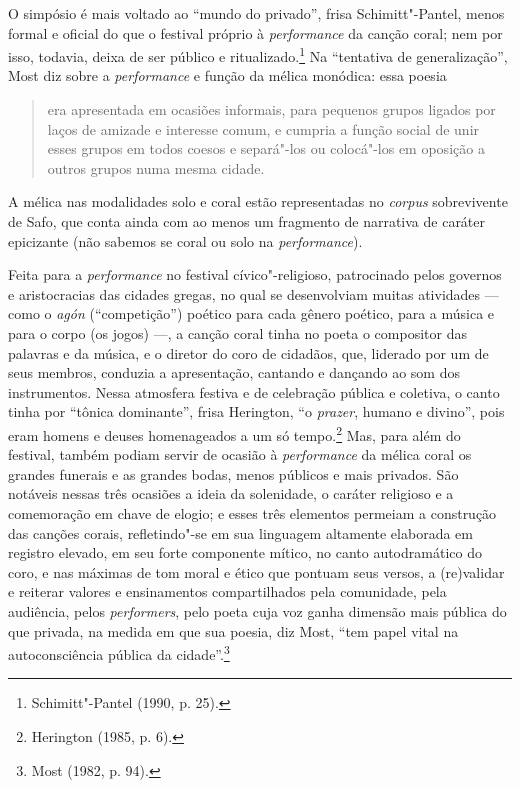 O simpósio é mais voltado ao “mundo do privado”, frisa Schimitt"-Pantel, menos
formal e oficial do que o festival próprio à \textit{performance}
da canção coral; nem por isso, todavia, deixa de ser público e
ritualizado.\footnote{ Schimitt"-Pantel (1990, p. 25).} Na
“tentativa de generalização”, Most diz sobre a \textit{performance} e função da
mélica monódica: essa poesia 

\begin{quote}
era apresentada em ocasiões informais, para
pequenos grupos ligados por laços de amizade e interesse comum, e cumpria a
função social de unir esses grupos em todos coesos e separá"-los ou colocá"-los
em oposição a outros grupos numa mesma cidade.
\end{quote}

A mélica nas modalidades solo e coral estão representadas no \textit{corpus} sobrevivente
de Safo, que conta ainda com ao menos um fragmento de narrativa de
caráter epicizante (não sabemos se coral ou solo na \textit{performance}).

Feita para a \textit{performance} no festival cívico"-religioso, patrocinado
pelos governos e aristocracias das cidades gregas, no qual se
desenvolviam muitas atividades --- como o \textit{agón} (“competição”) poético
para cada gênero poético, para a música e para o corpo (os jogos) \mbox{---,} a canção coral tinha no poeta o compositor das palavras e
da música, e o diretor do coro de cidadãos, que, liderado por um de seus
membros, conduzia a apresentação, cantando e dançando ao som dos instrumentos.
Nessa atmosfera festiva e de celebração pública e coletiva, o canto tinha por
“tônica dominante”, frisa Herington, “o \textit{prazer}, humano e
divino”, pois eram homens e deuses homenageados a um só tempo.\footnote{ Herington (1985, p. 6).} Mas, para além
do festival, também podiam servir de ocasião à
\textit{performance} da mélica coral os grandes funerais e as grandes bodas,
menos públicos e mais privados. São notáveis nessas três ocasiões a ideia da
solenidade, o caráter religioso e a comemoração em chave de elogio; e esses
três elementos permeiam a construção das canções corais, refletindo"-se
em sua linguagem altamente elaborada em registro elevado, em seu forte
componente mítico, no canto autodramático do coro, e nas máximas de tom moral
e ético que pontuam seus versos, a (re)validar e reiterar valores e
ensinamentos compartilhados pela comunidade, pela audiência, pelos
\textit{performers}, pelo poeta cuja voz ganha dimensão mais
pública do que privada, na medida em que sua poesia, diz Most,
“tem papel vital na autoconsciência pública da cidade”.\footnote{ Most (1982, p. 94).}

